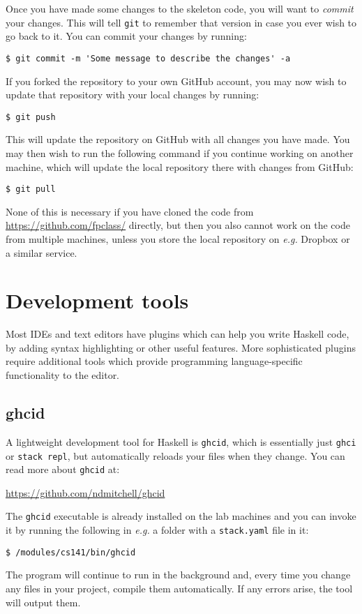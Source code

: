 Once you have made some changes to the skeleton code, you will want to \emph{commit} your changes. This will tell \texttt{\small git} to remember that version in case you ever wish to go back to it. You can commit your changes by running:
\begin{verbatim}
$ git commit -m 'Some message to describe the changes' -a
\end{verbatim}
If you forked the repository to your own GitHub account, you may now wish to update that repository with your local changes by running:
\begin{verbatim}
$ git push
\end{verbatim}
This will update the repository on GitHub with all changes you have made. You may then wish to run the following command if you continue working on another machine, which will update the local repository there with changes from GitHub:
\begin{verbatim}
$ git pull
\end{verbatim}
None of this is necessary if you have cloned the code from {\small \url{https://github.com/fpclass/}} directly, but then you also cannot work on the code from multiple machines, unless you store the local repository on \emph{e.g.} Dropbox or a similar service. 

\section{Development tools}
\label{sec:dev-tools}

Most IDEs and text editors have plugins which can help you write Haskell code, by adding syntax highlighting or other useful features. More sophisticated plugins require additional tools which provide programming language-specific functionality to the editor. 

\subsection{ghcid}

A lightweight development tool for Haskell is \texttt{\small ghcid}, which is essentially just \texttt{\small ghci} or \texttt{\small stack repl}, but automatically reloads your files when they change. You can read more about \texttt{\small ghcid} at:
\begin{center} \small
	\url{https://github.com/ndmitchell/ghcid}
\end{center}
The \texttt{\small ghcid} executable is already installed on the lab machines and you can invoke it by running the following in \emph{e.g.} a folder with a \texttt{\small stack.yaml} file in it:
\begin{verbatim}
$ /modules/cs141/bin/ghcid
\end{verbatim}
The program will continue to run in the background and, every time you change any files in your project, compile them automatically. If any errors arise, the tool will output them.

